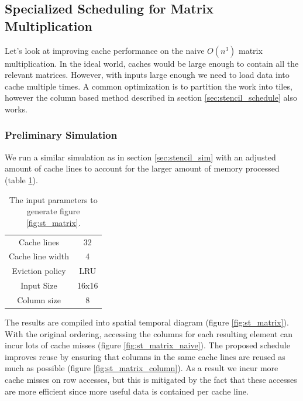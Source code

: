\documentclass{article}
\begin{document}
\subsection{Specialized Scheduling for Matrix Multiplication}
\label{sec:matrix_schedule}
Let's look at improving cache performance on the naive $O(n^3)$ matrix multiplication.
In the ideal world, caches would be large enough to contain all the relevant matrices.
However, with inputs large enough we need to load data into cache multiple times.
A common optimization is to partition the work into tiles, however the column based method described in section \ref{sec:stencil_schedule} also works.

\subsubsection{Preliminary Simulation}

We run a similar simulation as in section \ref{sec:stencil_sim} with an adjusted amount of cache lines to account for the larger amount of memory processed (table \ref{tab:sim_matrix_params}).

\begin{table}[H]
    \centering
    \begin{tabular}{|c c|}
        \hline
        Cache lines      & 32   \\
        Cache line width & 4    \\
        Eviction policy  & LRU  \\
        \hline
        Input Size       & 16x16\\
        Column size      & 8    \\
        \hline
    \end{tabular}
    \caption{
        The input parameters to generate figure \ref{fig:st_matrix}.
    }
    \label{tab:sim_matrix_params}
\end{table}

The results are compiled into spatial temporal diagram (figure \ref{fig:st_matrix}).
With the original ordering, accessing the columns for each resulting element can incur lots of cache misses (figure \ref{fig:st_matrix_naive}).
The proposed schedule improves reuse by ensuring that columns in the same cache lines are reused as much as possible (figure \ref{fig:st_matrix_column}).
As a result we incur more cache misses on row accesses, but this is mitigated by the fact that these accesses are more efficient since more useful data is contained per cache line.
\end{document}
